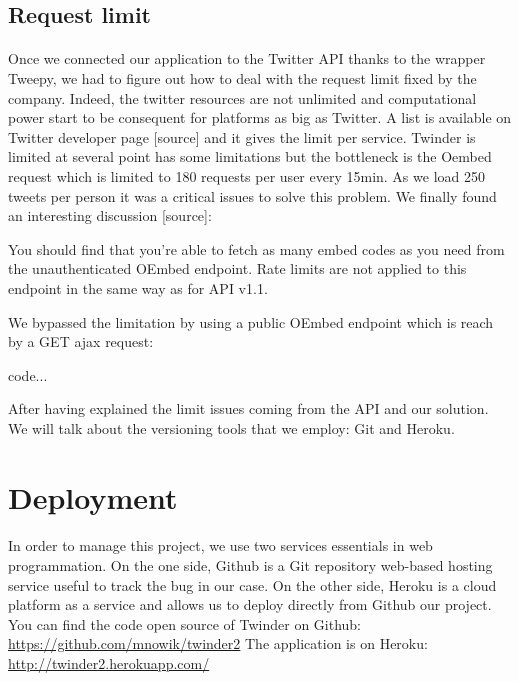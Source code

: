  \subsection{Request limit}
 
 \paragraph{}
Once we connected our application to the Twitter API thanks to the wrapper Tweepy, we had to figure out how to deal with the request limit fixed by the company. Indeed, the twitter resources are not unlimited and computational power start to be consequent for platforms as big as Twitter.
A list is available on Twitter developer page [source] and it gives the limit per service. Twinder is limited at several point has some limitations but the bottleneck is the Oembed request which is limited to 180 requests per user every 15min. As we load 250 tweets per person it was a critical issues to solve this problem. We finally found an interesting discussion [source]:

You should find that you're able to fetch as many embed codes as you need from the unauthenticated OEmbed endpoint. Rate limits are not applied to this endpoint in the same way as for API v1.1.

We bypassed the limitation by using a public OEmbed endpoint which is reach by a GET ajax request:

code...

After having explained the limit issues coming from the API and our solution. We will talk about the versioning tools that we employ: Git and Heroku.

 \section{Deployment}
 
  \paragraph{}
 In order to manage this project, we use two services essentials in web programmation. On the one side, Github is a Git repository web-based hosting service useful to track the bug in our case. On the other side, Heroku is a cloud platform as a service and allows us to deploy directly from Github our project.
You can find the code open source of Twinder on Github: \url{https://github.com/mnowik/twinder2}
The application is on Heroku: \url{http://twinder2.herokuapp.com/}




